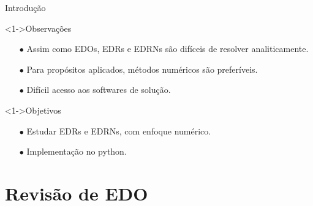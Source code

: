\documentclass{beamer}
\theoremstyle{plain}
\theoremstyle{definition}
\begin{document}
\begin{frame}{Introdução}

    \begin{exampleblock}
        <1->{Observações}
        \begin{itemize}
            \item[$\bullet$] Assim como EDOs, EDRs e EDRNs são difíceis de resolver analiticamente.
            \item[$\bullet$] Para propósitos aplicados, métodos numéricos são preferíveis.
            \item[$\bullet$] Difícil acesso aos softwares de solução.
        \end{itemize}
    \end{exampleblock}

    \begin{exampleblock}
        <1->{Objetivos}
        \begin{itemize}
            \item[$\bullet$] Estudar EDRs e EDRNs, com enfoque numérico.
            \item[$\bullet$] Implementação no python.
        \end{itemize}
    \end{exampleblock}


\end{frame}


\section{Revisão de EDO}
\end{document}
